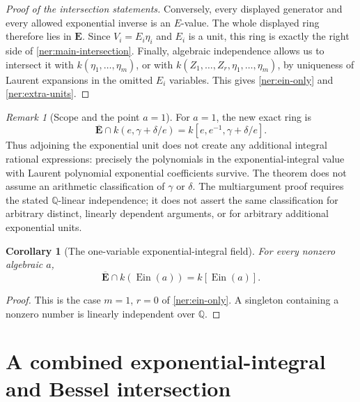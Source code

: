 \documentclass[11pt]{article}
\newtheorem{corollary}[theorem]{Corollary}
\theoremstyle{definition}
\theoremstyle{remark}
\newtheorem{remark}[theorem]{Remark}
\newcommand{\E}{\mathbf E}
\newcommand{\Ebar}{\overline{\mathbf E}}
\newcommand{\Ein}{\operatorname{Ein}}
\begin{document}
\begin{proof}[Proof of the intersection statements]
Conversely, every displayed generator and every allowed
exponential inverse is an $E$-value.  The whole displayed ring
therefore lies in $\E$.  Since $V_i=E_i\eta_i$ and
$E_i$ is a unit, this ring is exactly the right side of
\eqref{ner:main-intersection}.
Finally, algebraic independence allows us to intersect it with
$k(\eta_1,\ldots,\eta_m)$, or with
$k(Z_1,\ldots,Z_r,\eta_1,\ldots,\eta_m)$, by uniqueness of
Laurent expansions in the omitted $E_i$ variables.  This gives
\eqref{ner:ein-only} and \eqref{ner:extra-units}.
\end{proof}

\begin{remark}[Scope and the point $a=1$]
For $a=1$, the new exact ring is
\[
 \Ebar\cap k(e,\gamma+\delta/e)
          =k[e,e^{-1},\gamma+\delta/e].
\]
Thus adjoining the exponential unit does not create any
additional integral rational expressions: precisely the
polynomials in the exponential-integral value with Laurent
polynomial exponential coefficients survive.
The theorem does not assume an arithmetic classification of
$\gamma$ or $\delta$.  The multiargument proof requires the
stated $\mathbb Q$-linear independence; it does not assert the
same classification for arbitrary distinct, linearly dependent
arguments, or for arbitrary additional exponential units.
\end{remark}



\begin{corollary}[The one-variable exponential-integral field]
\label{mbc:ein}
For every nonzero algebraic $a$,
\[
 \Ebar\cap k(\Ein(a))=k[\Ein(a)].
\]
\end{corollary}
\begin{proof}
This is the case $m=1$, $r=0$ of
\eqref{ner:ein-only}.  A singleton containing a nonzero number is
linearly independent over $\mathbb Q$.
\end{proof}


\section{A combined exponential-integral and Bessel intersection}
\label{ncr:section}
\end{document}
